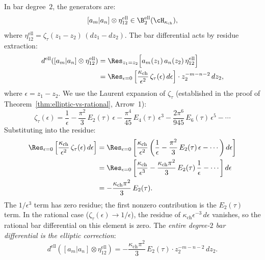 \begin{computation}
\label{comp:ell-bar-deg2}
In bar degree~$2$, the generators are:
\[
[a_m | a_n] \otimes \eta_{12}^{\mathrm{ell}}
\in \B^{\mathrm{ell}}_2(\cH_{\kappa_{\mathrm{ch}}}),
\]
where $\eta_{12}^{\mathrm{ell}} = \zeta_\tau(z_1 - z_2)\,(dz_1 - dz_2)$.
The bar differential acts by residue extraction:
\begin{align}\label{eq:ell-bar-diff-deg2}
d^{\mathrm{ell}}([a_m | a_n] \otimes \eta_{12}^{\mathrm{ell}})
&= \Res_{z_1 = z_2}\Bigl[
a_m(z_1)\,a_n(z_2)\,\eta_{12}^{\mathrm{ell}}
\Bigr] \notag \\
&= \Res_{\epsilon = 0}\left[
\frac{\kappa_{\mathrm{ch}}}{\epsilon^2}\,
\zeta_\tau(\epsilon)\,d\epsilon
\right] \cdot z_2^{-m-n-2}\,dz_2,
\end{align}
where $\epsilon = z_1 - z_2$. We use the Laurent expansion of
$\zeta_\tau$ (established in the proof of
Theorem~\ref{thm:elliptic-vs-rational}, Arrow~1):
\begin{equation}\label{eq:zeta-laurent}
\zeta_\tau(\epsilon)
= \frac{1}{\epsilon}
- \frac{\pi^2}{3}\,E_2(\tau)\,\epsilon
- \frac{\pi^4}{45}\,E_4(\tau)\,\epsilon^3
- \frac{2\pi^6}{945}\,E_6(\tau)\,\epsilon^5
- \cdots
\end{equation}
Substituting into the residue:
\begin{align}\label{eq:ell-residue-expansion}
\Res_{\epsilon = 0}\left[
\frac{\kappa_{\mathrm{ch}}}{\epsilon^2}\,
\zeta_\tau(\epsilon)\,d\epsilon
\right]
&= \Res_{\epsilon = 0}\left[
\frac{\kappa_{\mathrm{ch}}}{\epsilon^2}\left(
\frac{1}{\epsilon}
- \frac{\pi^2}{3}\,E_2(\tau)\,\epsilon
- \cdots
\right) d\epsilon
\right] \notag \\
&= \Res_{\epsilon = 0}\left[
\frac{\kappa_{\mathrm{ch}}}{\epsilon^3}
- \frac{\kappa_{\mathrm{ch}}\pi^2}{3}\,E_2(\tau)\,\frac{1}{\epsilon}
- \cdots
\right] d\epsilon \notag \\
&= -\frac{\kappa_{\mathrm{ch}}\pi^2}{3}\,E_2(\tau).
\end{align}
The $1/\epsilon^3$ term has zero residue; the first nonzero
contribution is the $E_2(\tau)$ term. In the rational case
($\zeta_\tau(\epsilon) \to 1/\epsilon$), the residue of
$\kappa_{\mathrm{ch}}\epsilon^{-3}\,d\epsilon$ vanishes, so the rational
bar differential on this element is zero. The
\emph{entire degree-$2$ bar differential is the elliptic
correction}:
\begin{equation}\label{eq:ell-bar-diff-result}
d^{\mathrm{ell}}([a_m | a_n] \otimes \eta_{12}^{\mathrm{ell}})
= -\frac{\kappa_{\mathrm{ch}}\pi^2}{3}\,E_2(\tau)
\cdot z_2^{-m-n-2}\,dz_2.
\end{equation}
\end{computation}

